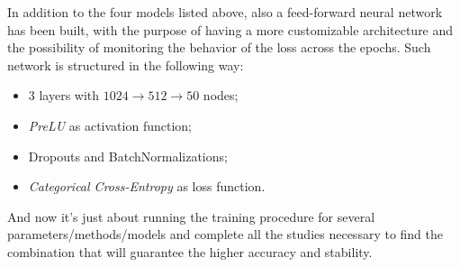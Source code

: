 In addition to the four models listed above, also a feed-forward neural network has been built, with the purpose of having a more customizable architecture and the possibility of monitoring the behavior of the loss across the epochs. Such network is structured in the following way:
\begin{itemize}
	\itemsep0em
	\item 3 layers with $1024 \to 512 \to 50$ nodes;
	\item \textit{PreLU} as activation function;
	\item Dropouts and BatchNormalizations;
	\item \textit{Categorical Cross-Entropy} as loss function.
\end{itemize}

And now it's just about running the training procedure for several parameters/methods/models and complete all the studies necessary to find the combination that will guarantee the higher accuracy and stability.


